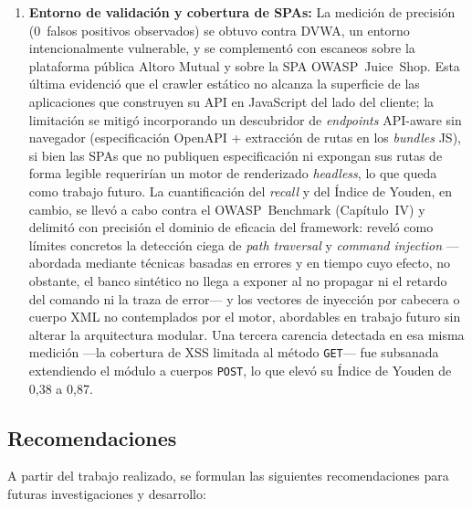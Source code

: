 \documentclass[12pt, a4paper]{article}
\begin{document}
\begin{enumerate}
    \item \textbf{Entorno de validación y cobertura de SPAs:} La medición de
    precisión (0~falsos positivos observados) se obtuvo contra DVWA, un entorno
    intencionalmente vulnerable, y se complementó con escaneos sobre la plataforma
    pública Altoro Mutual y sobre la SPA OWASP~Juice~Shop. Esta última evidenció
    que el crawler estático no alcanza la superficie de las aplicaciones que
    construyen su API en JavaScript del lado del cliente; la limitación se mitigó
    incorporando un descubridor de \textit{endpoints} API-aware sin navegador
    (especificación OpenAPI + extracción de rutas en los \textit{bundles} JS), si
    bien las SPAs que no publiquen especificación ni expongan sus rutas de forma
    legible requerirían un motor de renderizado \textit{headless}, lo que queda
    como trabajo futuro. La cuantificación del \textit{recall} y del Índice de
    Youden, en cambio, se llevó a cabo contra el OWASP~Benchmark (Capítulo~IV) y
    delimitó con precisión el dominio de eficacia del framework: reveló como
    límites concretos la detección ciega de \textit{path traversal} y \textit{command
    injection} ---abordada mediante técnicas basadas en errores y en tiempo cuyo
    efecto, no obstante, el banco sintético no llega a exponer al no propagar ni el
    retardo del comando ni la traza de error--- y los vectores de inyección por
    cabecera o cuerpo XML no contemplados por el motor, abordables en trabajo futuro
    sin alterar la arquitectura modular. Una tercera carencia detectada en
    esa misma medición ---la cobertura de XSS limitada al método \texttt{GET}--- fue
    subsanada extendiendo el módulo a cuerpos \texttt{POST}, lo que elevó su Índice
    de Youden de 0,38 a 0,87.
\end{enumerate}

\subsection{Recomendaciones}

A partir del trabajo realizado, se formulan las siguientes recomendaciones
para futuras investigaciones y desarrollo:
\end{document}
